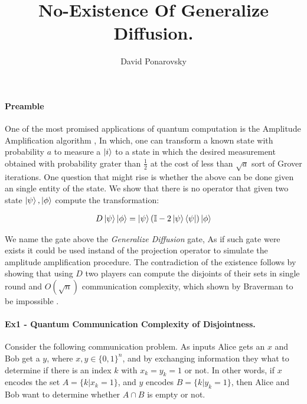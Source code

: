 \documentclass{article}
\begin{document}
\title{No-Existence Of Generalize Diffusion.}
\author{David Ponarovsky}
\maketitle
\begin{multicols*}{2}

  \paragraph{Preamble} One of the most promised applications of quantum computation is the Amplitude Amplification algorithm \cite{Brassard_2002}, In which, one can transform a known state with probability $a$ to measure a $\ket{i}$ to a state in which the desired measurement obtained with probability grater than $\frac{1}{2}$ at the cost of less than $\sqrt{a}$ sort of Grover iterations. One question that might rise is whether the above can be done given an single entity of the state. We show that there is no operator that given two state $\ket{\psi},\ket{\phi}$ compute the transformation: 
 
  
\begin{equation*}
  \begin{split}
    D \ket{\psi}\ket{\phi} = \ket{\psi}\left( \mathbb{I} - 2 \ket{\psi}\bra{\psi} \right)\ket{\phi} 
   \end{split}
\end{equation*}

We name the gate above the \textit{Generalize Diffusion} gate, As if such gate were exists it could be used instand of the projection operator to simulate the amplitude amplification procedure. The contradiction of the existence follows by showing that using $D$ two players can compute the disjoints of their sets in single round and $O\left( \sqrt{n} \right)$ communication complexity, which shown by Braverman to be impossible \cite{Braverman}.    
\paragraph{Ex1 - Quantum Communication Complexity of Disjointness.}
Consider the following communication
problem. As inputs Alice gets an \(x\) and Bob get a \(y\), where \(x, y \in \{0, 1\}^n \), and by exchanging information they what to determine if there is an index \(k\) with \(x_k = y_k = 1 \) or not. 
In other words, if \(x\) encodes the
set \(A = \{k | x_k = 1\} \), and \(y\) encodes \(B = \{k | y_k = 1\}\), then Alice and Bob want to determine whether \( A \cap B \) is empty or not.


\end{multicols*}
\end{document}

